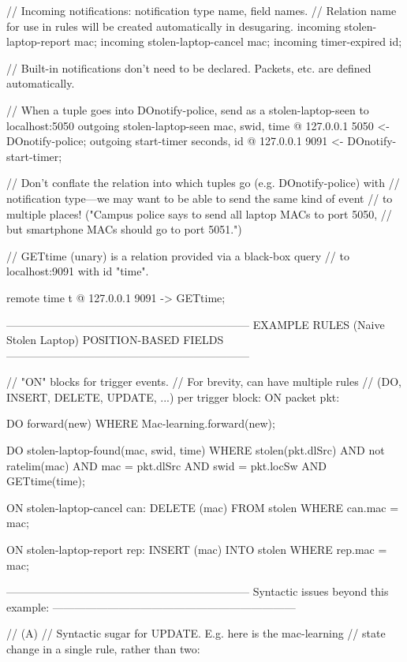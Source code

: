   // Incoming notifications: notification type name, field names.
  // Relation name for use in rules will be created automatically in desugaring.
  incoming stolen-laptop-report {mac};
  incoming stolen-laptop-cancel {mac};
  incoming timer-expired {id};  

  // Built-in notifications don't need to be declared. Packets, etc. are defined automatically.
  
  // When a tuple goes into DOnotify-police, send as a stolen-laptop-seen to localhost:5050
  outgoing stolen-laptop-seen {mac, swid, time} @ 127.0.0.1 5050 
    <- DOnotify-police;
  outgoing start-timer {seconds, id} @ 127.0.0.1 9091 
    <- DOnotify-start-timer;

  // Don't conflate the relation into which tuples go (e.g. DOnotify-police) with
  // notification type---we may want to be able to send the same kind of event
  // to multiple places! ("Campus police says to send all laptop MACs to port 5050,
  // but smartphone MACs should go to port 5051.")

  // GETtime (unary) is a relation provided via a black-box query
  // to localhost:9091 with id "time".

  remote time {t} @ 127.0.0.1 9091 -> 
    GETtime; 

------------------------------------------------------------------
EXAMPLE RULES (Naive Stolen Laptop)
POSITION-BASED FIELDS
------------------------------------------------------------------

// "ON" blocks for trigger events.
// For brevity, can have multiple rules 
// (DO, INSERT, DELETE, UPDATE, ...) per trigger block:
ON packet pkt:

  DO forward(new) WHERE
    Mac-learning.forward(new);

  DO stolen-laptop-found(mac, swid, time) WHERE  
    stolen(pkt.dlSrc) AND
    not ratelim(mac) AND    
    mac = pkt.dlSrc AND 
    swid = pkt.locSw AND
    GETtime(time);

ON stolen-laptop-cancel can:
  DELETE (mac) FROM stolen WHERE
    can.mac = mac;

ON stolen-laptop-report rep:
  INSERT (mac) INTO stolen WHERE
    rep.mac = mac;

------------------------------------------------------------------
Syntactic issues beyond this example:
------------------------------------------------------------------

// (A)
// Syntactic sugar for UPDATE. E.g. here is the mac-learning 
// state change in a single rule, rather than two:


